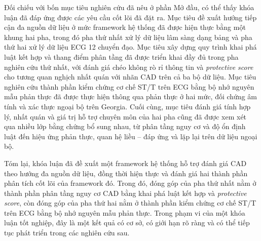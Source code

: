 \blocksep

Đối chiếu với bốn mục tiêu nghiên cứu đã nêu ở phần Mở đầu, có thể thấy khóa luận đã đáp ứng được các yêu cầu cốt lõi đã đặt ra. Mục tiêu đề xuất hướng tiếp cận đa nguồn dữ liệu ở mức framework hệ thống đã được hiện thực bằng một khung hai pha, trong đó pha thứ nhất xử lý dữ liệu lâm sàng dạng bảng và pha thứ hai xử lý dữ liệu ECG 12 chuyển đạo. Mục tiêu xây dựng quy trình khai phá luật kết hợp và thang điểm phân tầng đã được triển khai đầy đủ trong pha nghiên cứu thứ nhất, với đánh giá chéo không rò rỉ thông tin và \textit{protective score} cho tương quan nghịch nhất quán với nhãn CAD trên cả ba bộ dữ liệu. Mục tiêu nghiên cứu thành phần kiểm chứng cơ chế ST/T trên ECG bằng bộ nhớ nguyên mẫu phản thực đã được thực hiện thông qua phản thực ở hai mức, đối chứng âm tính và xác thực ngoại bộ trên Georgia. Cuối cùng, mục tiêu đánh giá tính hợp lý, nhất quán và giá trị hỗ trợ chuyên môn của hai pha cũng đã được xem xét qua nhiều lớp bằng chứng bổ sung nhau, từ phân tầng nguy cơ và độ ổn định luật đến hiệu ứng phản thực, quan hệ liều -- đáp ứng và lặp lại trên dữ liệu ngoại bộ.

\blocksep

Tóm lại, khóa luận đã đề xuất một framework hệ thống hỗ trợ đánh giá CAD theo hướng đa nguồn dữ liệu, đồng thời hiện thực và đánh giá hai thành phần phân tích cốt lõi của framework đó. Trong đó, đóng góp của pha thứ nhất nằm ở thành phần phân tầng nguy cơ CAD bằng khai phá luật kết hợp và \textit{protective score}, còn đóng góp của pha thứ hai nằm ở thành phần kiểm chứng cơ chế ST/T trên ECG bằng bộ nhớ nguyên mẫu phản thực. Trong phạm vi của một khóa luận tốt nghiệp, đây là một kết quả có cơ sở, có giới hạn rõ ràng và có thể tiếp tục phát triển trong các nghiên cứu sau.
